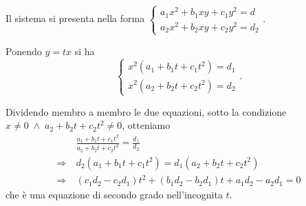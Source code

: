 Il sistema si presenta nella forma $\left\{\begin{array}{l}{a_1x^2+b_1xy+c_1y^2=d}\\{a_2x^2+b_2xy+c_2y^2=d_2}\end{array}\right.$.

Ponendo $y=tx$ si ha 
\[\left\{\begin{array}{l}{x^2(a_1+b_1t+c_1t^2)=d_1}\\{x^2(a_2+b_2t+c_2t^2)=d_2}\end{array}\right..\]

Dividendo membro a membro le due equazioni, sotto la condizione $x\neq 0\;\wedge\; a_2+b_2t+c_2t^2\neq 0$, otteniamo 
\begin{align*}
&\frac{a_1+b_1t+c_1t^2}{a_2+b_2t+c_2t^2}=\frac {d_1}{d_2}\\
\Rightarrow\: & d_2(a_1+b_1t+c_1t^2)=d_1(a_2+b_2t+c_2t^2)\\
\Rightarrow\: & (c_1d_2-c_2d_1)t^2+(b_1d_2-b_2d_1)t+a_1d_2-a_2d_1=0 
\end{align*}
che è una equazione di secondo grado nell'incognita $t$.

